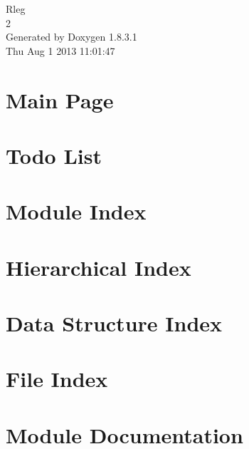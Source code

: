 \documentclass{book}
\begin{document}
\hypersetup{pageanchor=false,citecolor=blue}
\begin{titlepage}
\vspace*{7cm}
\begin{center}
{\Large Rleg \\[1ex]\large 2 }\\
\vspace*{1cm}
{\large Generated by Doxygen 1.8.3.1}\\
\vspace*{0.5cm}
{\small Thu Aug 1 2013 11:01:47}\\
\end{center}
\end{titlepage}
\clearemptydoublepage
{}
\tableofcontents
\clearemptydoublepage
{}
\hypersetup{pageanchor=true,citecolor=blue}
\chapter{Main Page}
\label{index}\hypertarget{index}{}
\chapter{Todo List}
\label{todo}
\hypertarget{todo}{}

\chapter{Module Index}

\chapter{Hierarchical Index}

\chapter{Data Structure Index}

\chapter{File Index}

\chapter{Module Documentation}









\end{document}
